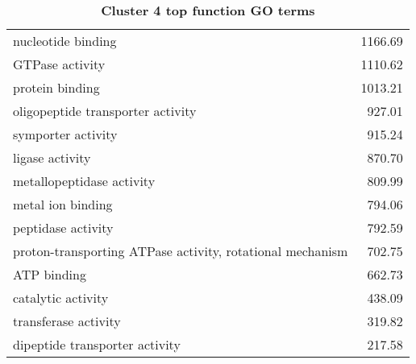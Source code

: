 \begin{table}[h]
\begin{center}
\begin{tabular}{p{}r}
nucleotide binding                                                                             & 1166.69                     \\
GTPase activity                                                                                & 1110.62                     \\
protein binding                                                                                & 1013.21                     \\
oligopeptide transporter activity                                                              & 927.01                      \\
symporter activity                                                                             & 915.24                      \\
ligase activity                                                                                & 870.70                      \\
metallopeptidase activity                                                                      & 809.99                      \\
metal ion binding                                                                              & 794.06                      \\
peptidase activity                                                                             & 792.59                      \\
proton-transporting ATPase activity, rotational mechanism                                      & 702.75                      \\
ATP binding                                                                                    & 662.73                      \\
catalytic activity                                                                             & 438.09                      \\
transferase activity                                                                           & 319.82                      \\
dipeptide transporter activity                                                                 & 217.58                      \\ \bottomrule
\end{tabular}
\end{center}

\caption[Cluster 4 top function GO terms]{\sf \textbf{Cluster 4 top function GO terms}}
\label{tab:cls4-function}
\end{table}